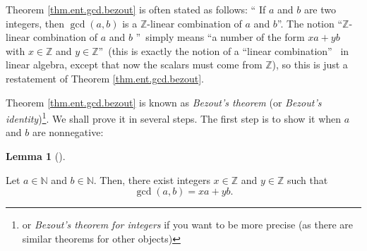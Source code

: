 \documentclass[numbers=enddot,12pt,final,onecolumn,notitlepage]{scrartcl}%
\numberwithin{exer}{subsection}
\theoremstyle{definition}
\newtheorem{lem}[theo]{Lemma}
\newenvironment{lemma}[1][]
{\begin{lem}[#1]\begin{leftbar}}
{\end{leftbar}\end{lem}}
\begin{document}
Theorem \ref{thm.ent.gcd.bezout} is often stated as follows: \textquotedblleft
If $a$ and $b$ are two integers, then $\gcd\left(  a,b\right)  $ is a
$\mathbb{Z}$-linear combination of $a$ and $b$\textquotedblright. The notion
\textquotedblleft$\mathbb{Z}$-linear combination of $a$ and $b$%
\textquotedblright\ simply means \textquotedblleft a number of the form
$xa+yb$ with $x\in\mathbb{Z}$ and $y\in\mathbb{Z}$\textquotedblright\ (this is
exactly the notion of a \textquotedblleft linear combination\textquotedblright%
\ in linear algebra, except that now the scalars must come from $\mathbb{Z}$),
so this is just a restatement of Theorem \ref{thm.ent.gcd.bezout}.

Theorem \ref{thm.ent.gcd.bezout} is known as \textit{Bezout's theorem} (or
\textit{Bezout's identity})\footnote{or \textit{Bezout's theorem for integers}
if you want to be more precise (as there are similar theorems for other
objects)}. We shall prove it in several steps. The first step is to show it
when $a$ and $b$ are nonnegative:

\begin{lemma}
\label{lem.ent.gcd.bezout.++}Let $a\in\mathbb{N}$ and $b\in\mathbb{N}$. Then,
there exist integers $x\in\mathbb{Z}$ and $y\in\mathbb{Z}$ such that%
\[
\gcd\left(  a,b\right)  =xa+yb.
\]

\end{lemma}
\end{document}
